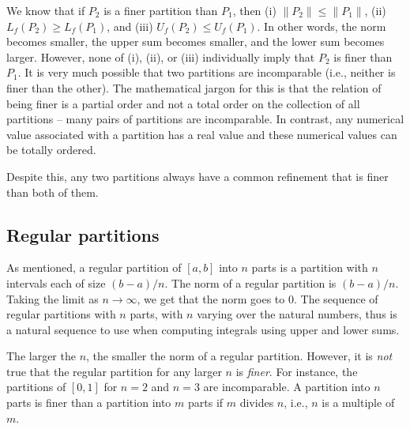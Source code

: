 \documentclass{amsart}
\begin{document}
We know that if $P_2$ is a finer partition than $P_1$, then (i) $\|
P_2 \| \le \| P_1 \|$, (ii) $L_f(P_2) \ge L_f(P_1)$, and (iii)
$U_f(P_2) \le U_f(P_1)$. In other words, the norm becomes smaller, the
upper sum becomes smaller, and the lower sum becomes larger. However,
none of (i), (ii), or (iii) individually imply that $P_2$ is finer
than $P_1$. It is very much possible that two partitions are
incomparable (i.e., neither is finer than the other). The mathematical
jargon for this is that the relation of being finer is a partial order
and not a total order on the collection of all partitions -- many
pairs of partitions are incomparable. In contrast, any numerical value
associated with a partition has a real value and these numerical
values can be totally ordered.

Despite this, any two partitions always have a common refinement that
is finer than both of them.

\subsection{Regular partitions}

As mentioned, a regular partition of $[a,b]$ into $n$ parts is a
partition with $n$ intervals each of size $(b - a)/n$. The norm of a
regular partition is $(b - a)/n$. Taking the limit as $n \to \infty$,
we get that the norm goes to $0$. The sequence of regular partitions
with $n$ parts, with $n$ varying over the natural numbers, thus is a
natural sequence to use when computing integrals using upper and lower
sums.

The larger the $n$, the smaller the norm of a regular
partition. However, it is {\em not} true that the regular partition
for any larger $n$ is {\em finer}. For instance, the partitions of
$[0,1]$ for $n = 2$ and $n = 3$ are incomparable. A partition into $n$
parts is finer than a partition into $m$ parts if $m$ divides $n$,
i.e., $n$ is a multiple of $m$.
\end{document}

